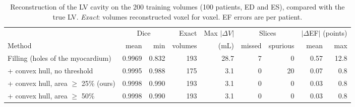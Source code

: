 \begin{table}[!htb]
\centering
\small
\setlength{\tabcolsep}{4pt}
\begin{adjustbox}{max width=\linewidth}
\begin{tabular}{lrrrrrrrr}
\toprule
& \multicolumn{2}{c}{Dice} & Exact & Max $|\Delta V|$ & \multicolumn{2}{c}{Slices} & \multicolumn{2}{c}{$|\Delta$EF$|$ (points)}\\
\cmidrule(lr){2-3}\cmidrule(lr){6-7}\cmidrule(lr){8-9}
Method & mean & min & volumes & (mL) & missed & spurious & mean & max\\
\midrule
Filling (holes of the myocardium) & 0.9969 & 0.832 & 193 & 28.7 & 7 & 0 & 0.57 & 12.8\\
+ convex hull, no threshold & 0.9995 & 0.988 & 175 & 3.1 & 0 & 20 & 0.07 & 0.8\\
+ convex hull, area $\geq$ 25\% (ours) & 0.9998 & 0.990 & 193 & 3.1 & 0 & 0 & 0.03 & 0.8\\
+ convex hull, area $\geq$ 50\% & 0.9998 & 0.990 & 193 & 3.1 & 0 & 0 & 0.03 & 0.8\\
\bottomrule
\end{tabular}
\end{adjustbox}
\caption{Reconstruction of the LV cavity on the 200 training volumes (100 patients, ED and ES), compared with the
true LV. \emph{Exact}: volumes reconstructed voxel for voxel. EF errors are per patient.}
\label{tab:lv}
\end{table}
